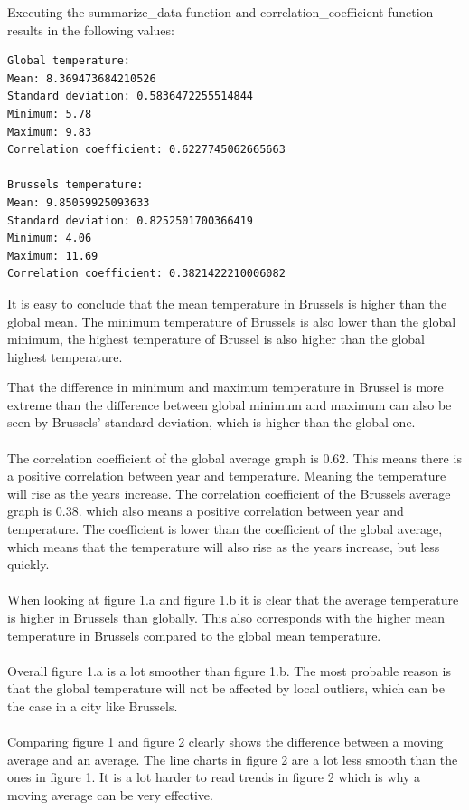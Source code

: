 \documentclass{article}
\begin{document}
Executing the summarize\_data function and correlation\_coefficient function results in the following values:

\begin{verbatim}
Global temperature:
Mean: 8.369473684210526
Standard deviation: 0.5836472255514844
Minimum: 5.78
Maximum: 9.83
Correlation coefficient: 0.6227745062665663

Brussels temperature:
Mean: 9.85059925093633
Standard deviation: 0.8252501700366419
Minimum: 4.06
Maximum: 11.69
Correlation coefficient: 0.3821422210006082
\end{verbatim}


It is easy to conclude that the mean temperature in Brussels is higher than the global mean. The minimum temperature of Brussels is also lower than the global minimum, the highest temperature of Brussel is also higher than the global highest temperature. 

That the difference in minimum and maximum temperature in Brussel is more extreme than the difference between global minimum and maximum can also be seen by Brussels' standard deviation, which is higher than the global one.

\paragraph{}
The correlation coefficient of the global average graph is 0.62. This means there is a positive correlation between year and temperature. Meaning the temperature will rise as the years increase.
The correlation coefficient of the Brussels average graph is 0.38. which also means a positive correlation between year and temperature. The coefficient is lower than the coefficient of the global average, which means that the temperature will also rise as the years increase, but less quickly.

\paragraph{}
When looking at figure 1.a and figure 1.b it is clear that the average temperature is higher in Brussels than globally. This also corresponds with the higher mean temperature in Brussels compared to the global mean temperature.

\paragraph{}
Overall figure 1.a is a lot smoother than figure 1.b. The most probable reason is that the global temperature will not be affected by local outliers, which can be the case in a city like Brussels. 

\paragraph{}
Comparing figure 1 and figure 2 clearly  shows the difference between a moving average and an average. The line charts in figure 2 are a lot less smooth than the ones in figure 1. It is a lot harder to read trends in figure 2 which is why a moving average can be very effective.
\end{document}

